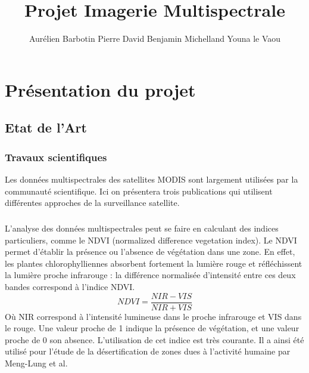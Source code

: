 \documentclass[a4paper,10pt]{report}
\begin{document}
\title{Projet Imagerie Multispectrale}
\author{Aurélien Barbotin Pierre David Benjamin Michelland Youna le Vaou}

\maketitle

\chapter{Présentation du projet}


\section{Etat de l'Art}
\subsection{Travaux scientifiques}

Les données multispectrales des satellites MODIS sont largement utilisées par la communauté scientifique. Ici on présentera trois publications qui utilisent différentes approches de la surveillance satellite.

\paragraph{}
L'analyse des données multispectrales peut se faire en calculant des indices particuliers, comme le NDVI (normalized difference vegetation index). Le NDVI permet d'établir la présence ou l'absence de végétation dans une zone. En effet, les plantes chlorophylliennes absorbent fortement la lumière rouge et réfléchissent la lumière proche infrarouge : la différence normalisée d'intensité entre ces deux bandes correspond à l'indice NDVI. 
\begin{equation}
NDVI=\frac{NIR-VIS}{NIR+VIS}
\end{equation}
Où NIR correspond à l'intensité lumineuse dans le proche infrarouge et VIS dans le rouge.\newline
Une valeur proche de 1 indique la présence de végétation, et une valeur proche de 0 son absence. L'utilisation de cet indice est très courante. Il a ainsi été utilisé pour l'étude de la désertification de zones dues à l'activité humaine\cite{desert} par Meng-Lung et al.
\end{document}
